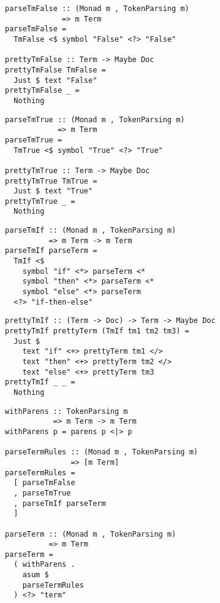 \documentclass[aspectration=169]{beamer}
\begin{document}
\begin{frame}[fragile]
  \begin{verbatim}
parseTmFalse :: (Monad m , TokenParsing m)
             => m Term           
parseTmFalse =
  TmFalse <$ symbol "False" <?> "False"

prettyTmFalse :: Term -> Maybe Doc
prettyTmFalse TmFalse =
  Just $ text "False"
prettyTmFalse _ =
  Nothing
  \end{verbatim}
\end{frame} 

\begin{frame}[fragile]
  \begin{verbatim}
parseTmTrue :: (Monad m , TokenParsing m)
            => m Term
parseTmTrue =
  TmTrue <$ symbol "True" <?> "True"

prettyTmTrue :: Term -> Maybe Doc
prettyTmTrue TmTrue =
  Just $ text "True"
prettyTmTrue _ =
  Nothing
  \end{verbatim}
\end{frame} 

\begin{frame}[fragile]
  \begin{verbatim}
parseTmIf :: (Monad m , TokenParsing m)
          => m Term -> m Term
parseTmIf parseTerm =
  TmIf <$
    symbol "if" <*> parseTerm <*
    symbol "then" <*> parseTerm <*
    symbol "else" <*> parseTerm
  <?> "if-then-else"
  \end{verbatim}
\end{frame} 

\begin{frame}[fragile]
  \begin{verbatim}
prettyTmIf :: (Term -> Doc) -> Term -> Maybe Doc
prettyTmIf prettyTerm (TmIf tm1 tm2 tm3) =
  Just $
    text "if" <+> prettyTerm tm1 </>
    text "then" <+> prettyTerm tm2 </>
    text "else" <+> prettyTerm tm3
prettyTmIf _ _ =
  Nothing
  \end{verbatim}
\end{frame} 

\begin{frame}[fragile]
  \begin{verbatim}
withParens :: TokenParsing m 
           => m Term -> m Term
withParens p = parens p <|> p

parseTermRules :: (Monad m , TokenParsing m)
               => [m Term]
parseTermRules =
  [ parseTmFalse
  , parseTmTrue
  , parseTmIf parseTerm
  ]

parseTerm :: (Monad m , TokenParsing m)
          => m Term
parseTerm =
  ( withParens .
    asum $
    parseTermRules
  ) <?> "term"
  \end{verbatim}
\end{frame} 
\end{document}
